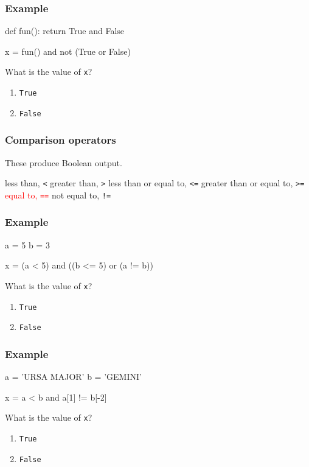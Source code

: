 \documentclass[11pt]{beamer}
\begin{document}
\begin{frame}[fragile]
  \frametitle{Example}
  \Enlarge

  \begin{semiverbatim}
def fun():
    return True and False

x = fun() and not (True or False)
  \end{semiverbatim}
  What is the value of \texttt{x}?
  \begin{enumerate}[label=\Alph*]
  \item  \texttt{True}
  \item  \texttt{False}
  \end{enumerate}
\end{frame}

\begin{frame}[fragile]
  \frametitle{Comparison operators}
  \Enlarge

  \begin{itemize}
  \myitem  These produce Boolean output.
    \begin{itemize}
    \mysubitem  less than, \texttt{<}
    \mysubitem  greater than, \texttt{>}
    \mysubitem  less than or equal to, \texttt{<=}
    \mysubitem  greater than or equal to, \texttt{>=}
    \mysubitem  \textcolor{red}{equal to, \texttt{==}}
    \mysubitem  not equal to, \texttt{!=}
    \end{itemize}
  \end{itemize}
\end{frame}

\begin{frame}[fragile]
  \frametitle{Example}
  \Enlarge

  \begin{semiverbatim}
a = 5
b = 3

x = (a < 5) and ((b <= 5) or (a != b))
  \end{semiverbatim}
  What is the value of \texttt{x}?
  \begin{enumerate}[label=\Alph*]
  \item  \texttt{True}
  \item  \texttt{False}
  \end{enumerate}
\end{frame}

\begin{frame}[fragile]
  \frametitle{Example}
  \Enlarge

  \begin{semiverbatim}
a = 'URSA MAJOR'
b = 'GEMINI'

x = a < b and a[1] != b[-2]
  \end{semiverbatim}
  What is the value of \texttt{x}?
  \begin{enumerate}[label=\Alph*]
  \item  \texttt{True}
  \item  \texttt{False}
  \end{enumerate}
\end{frame}
\end{document}
